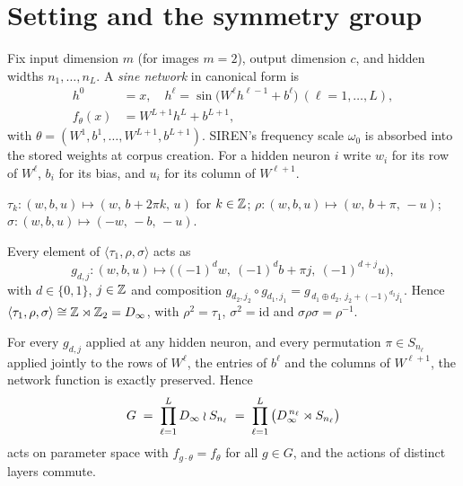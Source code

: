 \section{Setting and the symmetry group}\label{sec:group}

Fix input dimension $m$ (for images $m=2$), output dimension $c$, and hidden widths
$n_1,\dots,n_L$. A \emph{sine network} in canonical form is
\begin{equation}
\begin{aligned}
h^0 &= x, \quad h^\ell = \sin\!\big(W^\ell h^{\ell-1} + b^\ell\big)\ (\ell = 1,\dots,L),\\
f_\theta(x) &= W^{L+1} h^L + b^{L+1},
\end{aligned}
\label{eq:siren}
\end{equation}
with $\theta = (W^1,b^1,\dots,W^{L+1},b^{L+1})$. SIREN's frequency scale $\omega_0$
\citep{sitzmann2020siren} is absorbed into the stored weights at corpus creation. For a hidden
neuron $i$ write $w_i$ for its row of $W^\ell$, $b_i$ for its bias, and $u_i$ for its column of
$W^{\ell+1}$.

\begin{definition}\label{def:gen}
$\tau_k : (w,b,u) \mapsto (w,\, b + 2\pi k,\, u)$ for $k\in\mathbb{Z}$;
$\rho : (w,b,u) \mapsto (w,\, b+\pi,\, -u)$;
$\sigma : (w,b,u) \mapsto (-w,\, -b,\, -u)$.
\end{definition}

\begin{lemma}\label{lem:normal}
Every element of $\langle \tau_1,\rho,\sigma\rangle$ acts as
\begin{equation}
g_{d,j}\colon (w,b,u) \longmapsto \big((-1)^d w,\ (-1)^d b + \pi j,\ (-1)^{d+j} u\big),
\label{eq:normalform}
\end{equation}
with $d \in \{0,1\}$, $j\in\mathbb{Z}$ and composition
$g_{d_2,j_2}\circ g_{d_1,j_1} = g_{\,d_1\oplus d_2,\ j_2 + (-1)^{d_2} j_1}$. Hence
$\langle \tau_1,\rho,\sigma\rangle \cong \mathbb{Z} \rtimes \mathbb{Z}_2 = D_\infty$, with $\rho^2 = \tau_1$,
$\sigma^2 = \mathrm{id}$ and $\sigma\rho\sigma = \rho^{-1}$.
\end{lemma}

\begin{theorem}\label{thm:po1}
For every $g_{d,j}$ applied at any hidden neuron, and every permutation $\pi \in S_{n_\ell}$
applied jointly to the rows of $W^\ell$, the entries of $b^\ell$ and the columns of $W^{\ell+1}$,
the network function is exactly preserved. Hence
\begin{equation}
G \;=\; \prod_{\ell=1}^{L} D_\infty \wr S_{n_\ell}
    \;=\; \prod_{\ell=1}^{L} \big(D_\infty^{\,n_\ell} \rtimes S_{n_\ell}\big)
\end{equation}
acts on parameter space with $f_{g\cdot\theta} = f_\theta$ for all $g\in G$, and the actions of
distinct layers commute.
\end{theorem}

